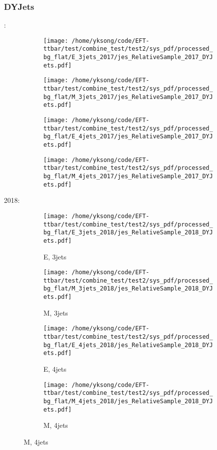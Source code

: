 \documentclass{beamer}
\begin{document}
\begin{frame}
\frametitle{DYJets}
\fontsize{5}{1}:
\begin{figure}
\centering
\begin{subfigure}[b]{0.24\textwidth}
\texttt{[image: /home/yksong/code/EFT-ttbar/test/combine\_test/test2/sys\_pdf/processed\_bg\_flat/E\_3jets\_2017/jes\_RelativeSample\_2017\_DYJets.pdf]}
\end{subfigure}
\begin{subfigure}[b]{0.24\textwidth}
\texttt{[image: /home/yksong/code/EFT-ttbar/test/combine\_test/test2/sys\_pdf/processed\_bg\_flat/M\_3jets\_2017/jes\_RelativeSample\_2017\_DYJets.pdf]}
\end{subfigure}
\begin{subfigure}[b]{0.24\textwidth}
\texttt{[image: /home/yksong/code/EFT-ttbar/test/combine\_test/test2/sys\_pdf/processed\_bg\_flat/E\_4jets\_2017/jes\_RelativeSample\_2017\_DYJets.pdf]}
\end{subfigure}
\begin{subfigure}[b]{0.24\textwidth}
\texttt{[image: /home/yksong/code/EFT-ttbar/test/combine\_test/test2/sys\_pdf/processed\_bg\_flat/M\_4jets\_2017/jes\_RelativeSample\_2017\_DYJets.pdf]}
\end{subfigure}
\end{figure}
2018:
\begin{figure}
\centering
\begin{subfigure}[b]{0.24\textwidth}
\texttt{[image: /home/yksong/code/EFT-ttbar/test/combine\_test/test2/sys\_pdf/processed\_bg\_flat/E\_3jets\_2018/jes\_RelativeSample\_2018\_DYJets.pdf]}
\captionsetup{font=tiny}
\caption{E, 3jets}
\end{subfigure}
\begin{subfigure}[b]{0.24\textwidth}
\texttt{[image: /home/yksong/code/EFT-ttbar/test/combine\_test/test2/sys\_pdf/processed\_bg\_flat/M\_3jets\_2018/jes\_RelativeSample\_2018\_DYJets.pdf]}
\captionsetup{font=tiny}
\caption{M, 3jets}
\end{subfigure}
\begin{subfigure}[b]{0.24\textwidth}
\texttt{[image: /home/yksong/code/EFT-ttbar/test/combine\_test/test2/sys\_pdf/processed\_bg\_flat/E\_4jets\_2018/jes\_RelativeSample\_2018\_DYJets.pdf]}
\captionsetup{font=tiny}
\caption{E, 4jets}
\end{subfigure}
\begin{subfigure}[b]{0.24\textwidth}
\texttt{[image: /home/yksong/code/EFT-ttbar/test/combine\_test/test2/sys\_pdf/processed\_bg\_flat/M\_4jets\_2018/jes\_RelativeSample\_2018\_DYJets.pdf]}
\captionsetup{font=tiny}
\caption{M, 4jets}
\end{subfigure}
\end{figure}
\end{frame}
\end{document}
